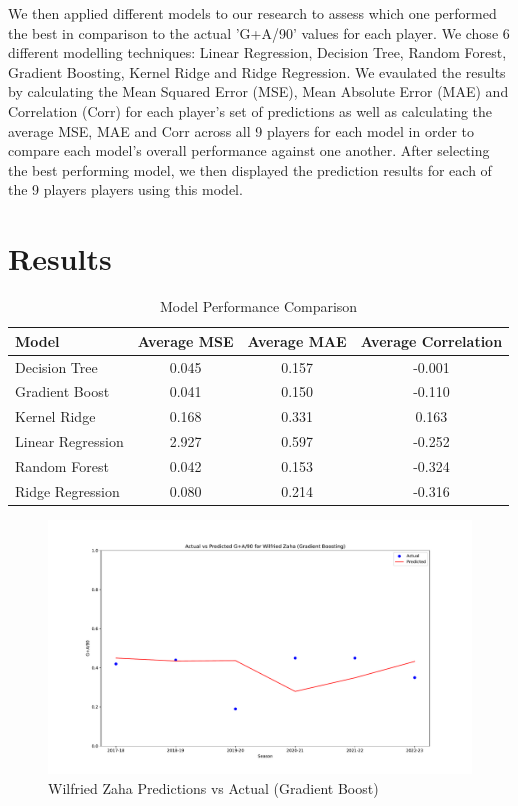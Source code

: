 \documentclass[12pt]{article}
\begin{document}
We then applied different models to our research to assess which one performed 
the best in comparison to the actual 'G+A/90' values for each player. We chose 
6 different modelling techniques:
Linear Regression, Decision Tree, Random Forest, Gradient Boosting, Kernel Ridge 
and Ridge Regression.
We evaulated the results by calculating the 
Mean Squared Error (MSE), Mean Absolute Error (MAE) and Correlation (Corr) for 
each player's set of predictions as well as calculating the average MSE, MAE and 
Corr across all 9 players for each model in order to compare each model's 
overall performance against one another.
After selecting the best performing model, we then displayed the prediction
results for each of the 9 players players using this model.





\section{Results}
\label{sec:resu}



\begin{table}[H]
  \centering
  \begin{tabular}{|l|c|c|c|}
  \hline
  \textbf{Model} & \textbf{Average MSE} & \textbf{Average MAE} & \textbf{Average Correlation} \\
  \hline
  Decision Tree & 0.045 & 0.157 & -0.001 \\
  Gradient Boost & 0.041 & 0.150 & -0.110 \\
  Kernel Ridge & 0.168 & 0.331 & 0.163 \\
  Linear Regression & 2.927 & 0.597 & -0.252 \\
  Random Forest & 0.042 & 0.153 & -0.324 \\
  Ridge Regression & 0.080 & 0.214 & -0.316 \\
  \hline
  \end{tabular}
  \caption{Model Performance Comparison}
  \label{tab:model_performance}
  \end{table}



\begin{figure}[H]
  \centering
  \includegraphics[width=1\textwidth]{GradBoost_Zaha.pdf}
  \caption{Wilfried Zaha Predictions vs Actual (Gradient Boost)}
  \label{fig:Zaha_graph}
  \end{figure}
\end{document}
